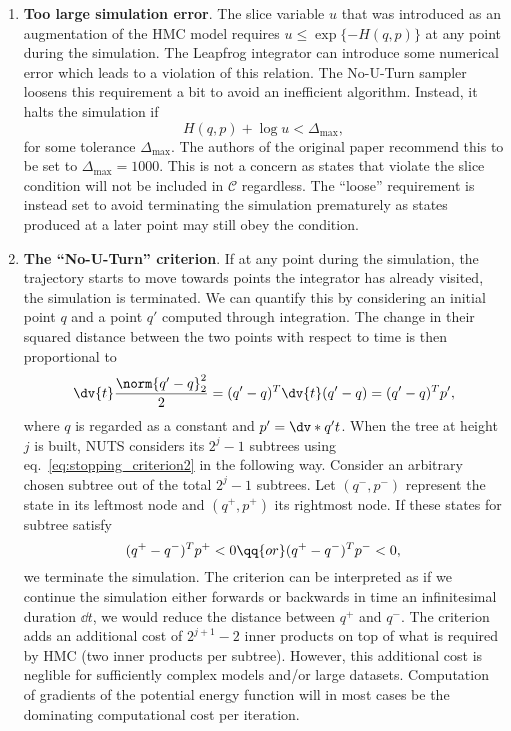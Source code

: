\begin{enumerate}
    \item \textbf{Too large simulation error}. The slice variable $u$ that was introduced as an augmentation of the HMC model requires $u \leq \exp\{-H(q,p)\}$ at any point during the simulation. The Leapfrog integrator can introduce some numerical error which leads to a violation of this relation. The No-U-Turn sampler loosens this requirement a bit to avoid an inefficient algorithm. Instead, it halts the simulation if
    \begin{equation}\label{eq:stopping_criterion1}
        H(q, p) + \log u < \Delta_\text{max},
    \end{equation} 
    for some tolerance $\Delta_\text{max}$. The authors of the original paper recommend this to be set to $\Delta_\text{max} = 1000$. This is not a concern as states that violate the slice condition will not be included in $\mathcal{C}$ regardless. The ``loose'' requirement is instead set to avoid terminating the simulation prematurely as states produced at a later point may still obey the condition.
    \item \textbf{The ``No-U-Turn'' criterion}. If at any point during the simulation, the trajectory starts to move towards points the integrator has already visited, the simulation is terminated. We can quantify this by considering an initial point $q$ and a point $q'$ computed through integration. The change in their squared distance between the two points with respect to time is then proportional to
    \begin{equation}\label{eq:stopping_criterion2}
        \dv{t}\frac{\norm{q' - q}_2^2}{2} = (q' - q)^T \dv{t}  (q' - q) = (q' - q)^Tp',
    \end{equation}
    where $q$ is regarded as a constant and $p' = \dv*{q'}{t}$. When the tree at height $j$ is built, NUTS considers its $2^j - 1$ subtrees using eq.~\eqref{eq:stopping_criterion2} in the following way. Consider an arbitrary chosen subtree out of the total $2^j - 1$ subtrees. Let $(q^-, p^-)$ represent the state in its leftmost node and $(q^+, p^+)$ its rightmost node. If these states for  subtree satisfy
    \begin{equation}\label{eq:stop}
        (q^+ - q^-)^Tp^+ < 0 \qq{or} (q^+ - q^-)^T p^- < 0,
    \end{equation}
    we terminate the simulation. The criterion can be interpreted as if we continue the simulation either forwards or backwards in time an infinitesimal duration $\dd t$, we would reduce the distance between $q^+$ and $q^-$. 
    The criterion adds an additional cost of $2^{j+1} - 2$ inner products on top of what is required by HMC (two inner products per subtree). However, this additional cost is neglible for sufficiently complex models and/or large datasets. Computation of gradients of the potential energy function will in most cases be the dominating computational cost per iteration.   
\end{enumerate}


